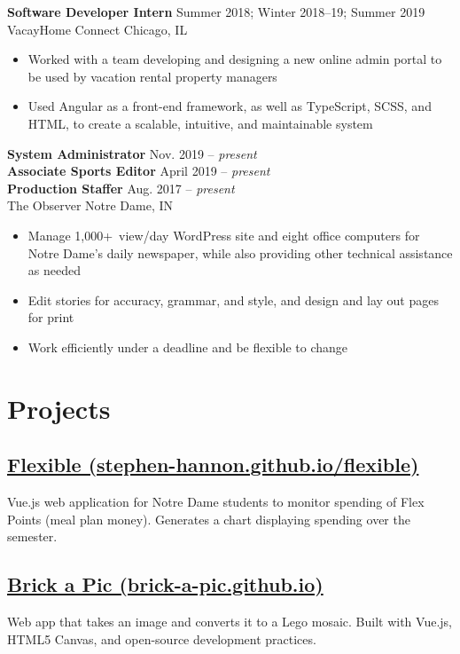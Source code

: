 \documentclass[letterpaper,10pt]{article}
\newcommand{\present}[0]{{\itshape present}}
\begin{document}
\begin{minipage}[t]{\dimexpr.67\textwidth-.5\columnsep}
\textbf{Software Developer Intern} \hfill Summer 2018; Winter 2018--19; Summer 2019 \\
VacayHome Connect \hfill Chicago, IL
\begin{itemize}
    \item Worked with a team developing and designing a new online admin portal to be used by vacation rental property managers
    \item Used Angular as a front-end framework, as well as TypeScript, SCSS, and HTML, to create a scalable, intuitive, and maintainable system
\end{itemize}

\textbf{System Administrator} \hfill Nov. 2019 -- \present{} \\
\textbf{Associate Sports Editor} \hfill April 2019 -- \present{} \\
\textbf{Production Staffer} \hfill Aug. 2017 -- \present{} \\
The Observer \hfill Notre Dame, IN

\begin{itemize}
    \item Manage 1,000+~view/day WordPress site and eight office computers for Notre Dame’s daily newspaper, while also providing other technical assistance as needed
    \item Edit stories for accuracy, grammar, and style, and design and lay out pages for print
    \item Work efficiently under a deadline and be flexible to change
\end{itemize}

\section{Projects}

\subsection[Flexible]{\href{https://stephen-hannon.github.io/flexible/}{Flexible (stephen-hannon.github.io/flexible)}}
Vue.js web application for Notre Dame students to monitor spending of Flex Points (meal plan money). Generates a chart displaying spending over the semester.

\subsection[Brick a Pic]{\href{https://brick-a-pic.github.io/brick-a-pic}{Brick a Pic (brick-a-pic.github.io)}}
Web app that takes an image and converts it to a Lego mosaic. Built with Vue.js, HTML5 Canvas, and open-source development practices.


\end{minipage}
\end{document}
